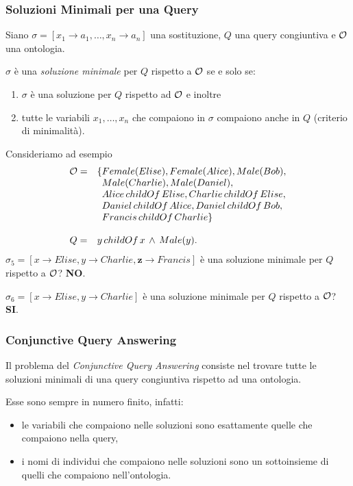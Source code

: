 \documentclass[8pt]{beamer}
\begin{document}
\begin{frame}
\frametitle{Soluzioni Minimali per una Query}
Siano $\sigma=[x_1 \rightarrow a_1, \ldots, x_n \rightarrow a_n]$ 
una sostituzione, $Q$ una query congiuntiva e $\mathcal{O}$ una ontologia.
\vspace{\baselineskip}

$\sigma$ \`e una \emph{soluzione minimale} per $Q$ rispetto a $\mathcal{O}$
se e solo se:
\begin{enumerate}
 \item $\sigma$ \`e una soluzione per $Q$ rispetto ad $\mathcal{O}$ e inoltre
 \item tutte le variabili $x_1, \ldots, x_n$ che compaiono in $\sigma$
 compaiono anche in $Q$ (criterio di minimalit\`a).
\end{enumerate}
Consideriamo ad esempio
\[
\begin{array}{cl}
  \Ont  =  &  \{Female(Elise), Female(Alice), Male(Bob), \\
  &\phantom{\{}Male(Charlie), Male(Daniel), \\
  &\phantom{\{}Alice\,childOf\,Elise, Charlie\,childOf\,Elise, \\
  &\phantom{\{}Daniel\,childOf\,Alice, Daniel\,childOf\,Bob, \\
  &\phantom{\{}Francis\,childOf\,Charlie \}\\
  &\\
  Q = & y\,childOf\,x\,\wedge\,Male(y) .
 \end{array}
\]
$\sigma_5=[x \rightarrow Elise, y \rightarrow Charlie, \mathbf{z} \rightarrow Francis]$ \`e una 
soluzione minimale per $Q$ rispetto a $\mathcal{O}$? \textbf{NO}.
\vspace{\baselineskip}

$\sigma_6=[x \rightarrow Elise, y \rightarrow Charlie]$ \`e una 
soluzione minimale per $Q$ rispetto a $\mathcal{O}$? \textbf{SI}.
\end{frame}

\begin{frame}
\frametitle{Conjunctive Query Answering}
Il problema del \emph{Conjunctive Query Answering} consiste nel trovare
tutte le soluzioni minimali di una query congiuntiva rispetto ad una ontologia.
\vspace{\baselineskip}

Esse sono sempre in numero finito, infatti:
\begin{itemize}
 \item le variabili che compaiono nelle soluzioni sono esattamente quelle che compaiono nella query,
 \item i nomi di individui che compaiono nelle soluzioni sono un sottoinsieme di quelli che compaiono
 nell'ontologia.
\end{itemize}
\end{frame}
\end{document}
